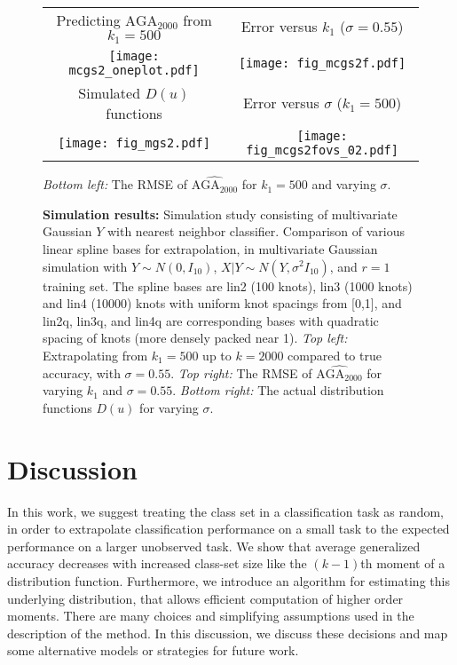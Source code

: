 \documentclass[twoside,11pt]{article}
\newenvironment{myfont}{\fontfamily{phv}\selectfont}{\par}
\begin{document}
\begin{figure}
\centering
\begin{tabular}{cc}
\begin{myfont}Predicting $\text{AGA}_{2000}$ from $k_1 = 500$\end{myfont} &
\begin{myfont}Error versus $k_1$ ($\sigma = 0.55$)\end{myfont}\\
\texttt{[image: mcgs2\_oneplot.pdf]} &
\texttt{[image: fig\_mcgs2f.pdf]}\\
\begin{myfont}Simulated $D(u)$ functions\end{myfont} &
\begin{myfont}Error versus $\sigma$ ($k_1 = 500$)\end{myfont}\\
\texttt{[image: fig\_mgs2.pdf]} &
\texttt{[image: fig\_mcgs2fovs\_02.pdf]}\\ 
\end{tabular}
\caption{\textbf{Simulation results:}
 Simulation study consisting of multivariate Gaussian $Y$ with nearest neighbor classifier.  Comparison of various linear spline bases for extrapolation,
  in multivariate Gaussian simulation with $Y \sim N(0, I_{10})$, $X|Y
  \sim N(Y, \sigma^2 I_{10})$, and $r=1$ training set.  The spline
  bases are lin2 (100 knots), lin3 (1000 knots) and lin4 (10000) knots
  with uniform knot spacings from [0,1], and lin2q, lin3q, and lin4q
  are corresponding bases with quadratic spacing of knots (more
  densely packed near 1).  \emph{Top left:} Extrapolating from $k_1 = 500$ up to $k
  = 2000$ compared to true accuracy, with $\sigma = 0.55$. \emph{Top right:} The
  RMSE of $\widehat{\text{AGA}_{2000}}$ for varying $k_1$ and $\sigma
  = 0.55$. \emph{Bottom right:} The actual distribution functions
  $D(u)$ for varying $\sigma$.} \emph{Bottom left:} The RMSE of $\widehat{\text{AGA}_{2000}}$ for $k_1 = 500$ and varying $\sigma$. 
\label{fig:sim_study}
\end{figure}


\section{Discussion}
\label{sec:discussion}
In this work, we suggest treating the class set in a classification
task as random, in order to extrapolate classification performance on
a small task to the expected performance on a larger unobserved task.
We show that average generalized accuracy decreases with increased
class-set size like the $(k-1)$th moment of a distribution function.
Furthermore, we introduce an algorithm for estimating this underlying
distribution, that allows efficient computation of higher order
moments.  There are many choices and simplifying assumptions used in
the description of the method.  In this discussion, we discuss these
decisions and map some alternative models or strategies for future
work.
\end{document}
